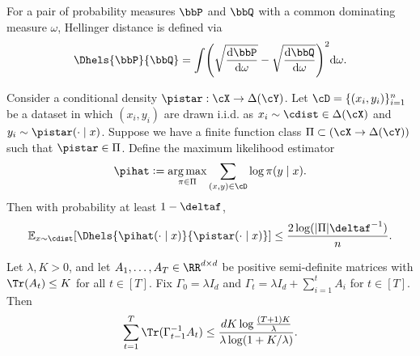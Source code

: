 For a pair of probability measures $\bbP$ and $\bbQ$ with
a common dominating measure $\omega$, Hellinger distance is defined
via
\begin{align}
\Dhels{\bbP}{\bbQ}=\int\prn*{\sqrt{\frac{\mathrm{d}\bbP}{\mathrm{d}\omega}}-\sqrt{\frac{\mathrm{d}\bbQ}{\mathrm{d}\omega}}}^2\mathrm{d}\omega.
\end{align}

\begin{lemma}
  \label{lem:mle}
  Consider a conditional density $\pistar : \cX \rightarrow
  \Delta(\cY)$. Let $\cD = \{(x_i,y_i)\}_{i=1}^n$ be a dataset in which $(x_i,y_i)$ are drawn i.i.d. as $x_i \sim \cdist \in \Delta(\cX)$ and $y_i \sim \pistar(\cdot\mid{}x)$. Suppose we have a finite function class $\Pi\subset(\cX\to\Delta(\cY))$ such that $\pistar \in \Pi$. Define the maximum likelihood estimator
  \begin{align}
    \pihat \ldef \argmax_{\pi \in \Pi} \sum_{(x,y) \in \cD} \log \pi(y\mid{}x).
  \end{align}
  Then with probability at least $1-\deltaf$, 
  \begin{align}
    \En_{x \sim \cdist}\brk*{\Dhels{\pihat(\cdot\mid{}x)}{\pistar(\cdot\mid{}x)}} \le \frac{2\log(|\Pi|\deltaf^{-1})}{n}.
  \end{align}    
\end{lemma}

\begin{lemma}\label{lemma:elliptic}
Let $\lambda,K>0$, and let $A_1,\dots,A_T \in \RR^{d\times d}$ be positive semi-definite matrices with $\Tr(A_t) \leq K$ for all $t \in [T]$. Fix $\Gamma_0 = \lambda I_d$ and $\Gamma_t = \lambda I_d + \sum_{i=1}^t A_i$ for $t \in [T]$. Then
\[\sum_{t=1}^T \Tr(\Gamma_{t-1}^{-1} A_t) \leq \frac{dK\log \frac{(T+1)K}{\lambda}}{\lambda\log(1+K/\lambda)}.\]
\end{lemma}

